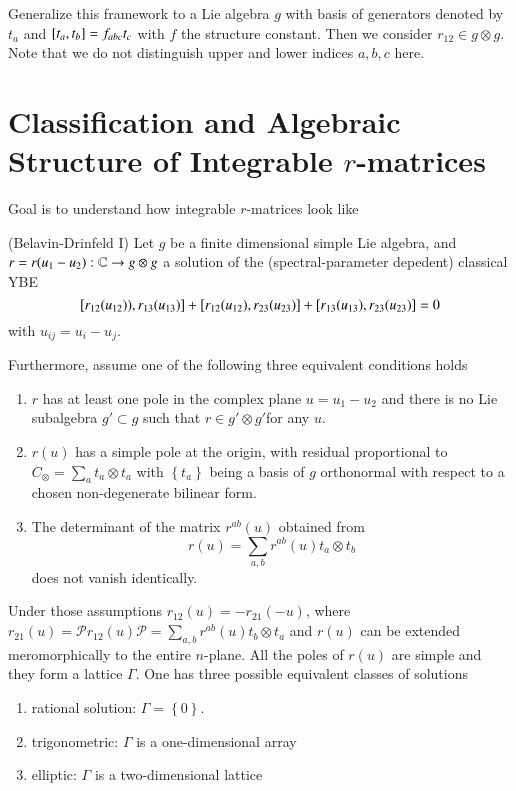 Generalize this framework to a Lie algebra $g$ with basis of generators denoted by $t_a$ and $\comm{t_a}{t_b} = f_{abc} t_c$ with $f$ the structure constant. Then we consider $r_{12} \in g \otimes g$. Note that we do not distinguish upper and lower indices $a, b, c$ here.

\section{Classification and Algebraic Structure of Integrable $r$-matrices}
Goal is to understand how integrable $r$-matrices look like

\begin{theorem} (Belavin-Drinfeld I)
	Let $g$ be a finite dimensional simple Lie algebra, and $r = r(u_1 - u_2): \mathbb{C} \rightarrow g \otimes g$ a solution of the (spectral-parameter depedent) classical YBE 
	\begin{equation}
		\comm{r_{12}(u_{12}))}{r_{13} (u_{13})} + \comm{r_{12}(u_{12})}{r_{23}(u_{23})} + \comm{r_{13}(u_{13})}{r_{23}(u_{23})} = 0
		\label{math:4.5}
	\end{equation}
	with $u_{ij} = u_{i} - u_j$.

	Furthermore, assume one of the following three equivalent conditions holds
	\begin{enumerate}
		\item $r$ has at least one pole in the complex plane $u = u_1 - u_2$ and there is no Lie subalgebra $g' \subset g$ such that $r \in g' \otimes g'$for any $u$.
		\item $r(u)$ has a simple pole at the origin, with residual proportional to $C_{\otimes} = \sum_a t_a \otimes t_a$ with $\left\{ t_a \right\} $ being a basis of $g$ orthonormal with respect to a chosen non-degenerate  bilinear form.
		\item The determinant of the matrix $r^{ab}(u)$ obtained from 
			\begin{equation*}
				r(u) = \sum_{a, b} r^{ab}(u) t_a \otimes t_b
			\end{equation*}
			does not vanish identically.
	\end{enumerate}

	Under those assumptions $r_{12}(u) = - r_{21}(-u)$, where $r_{21}(u) = \mathcal{P} r_{12} (u) \mathcal{P} = \sum_{a, b} r^{ab} (u ) t_b \otimes t_a$ and $r(u)$ can be extended meromorphically to the entire $n$-plane. All the poles of $r(u)$ are simple and they form a lattice $\Gamma$. One has three possible equivalent classes of solutions
	\begin{enumerate}
		\item rational solution: $\Gamma = \left\{ 0 \right\} $.
		\item trigonometric: $\Gamma$ is a one-dimensional array
		\item elliptic: $\Gamma$ is a two-dimensional lattice
	\end{enumerate}
\end{theorem}

